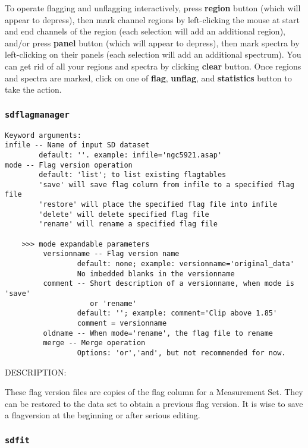 To operate flagging and unflagging interactively,
press {\bf region} button (which will appear to depress), 
then mark channel regions by left-clicking the mouse at start 
and end channels of the region (each selection will add an additional region), 
and/or press {\bf panel} button (which will appear to depress),
then mark spectra by left-clicking on their panels (each selection 
will add an additional spectrum).
You can get rid of all your regions and spectra by clicking {\bf clear} 
button.
Once regions and spectra are marked, click on one of {\bf flag},
{\bf unflag}, and {\bf statistics} button to take the action.


\subsubsection{{\tt sdflagmanager}}
\label{section:sd.sdtasks.tasks.sdflagmanager}

\begin{verbatim}
Keyword arguments:
infile -- Name of input SD dataset
        default: ''. example: infile='ngc5921.asap'
mode -- Flag version operation
        default: 'list'; to list existing flagtables
        'save' will save flag column from infile to a specified flag file
        'restore' will place the specified flag file into infile
        'delete' will delete specified flag file
        'rename' will rename a specified flag file

    >>> mode expandable parameters             
         versionname -- Flag version name
                 default: none; example: versionname='original_data'
                 No imbedded blanks in the versionname
         comment -- Short description of a versionname, when mode is 'save' 
                    or 'rename'
                 default: ''; example: comment='Clip above 1.85'
                 comment = versionname
         oldname -- When mode='rename', the flag file to rename
         merge -- Merge operation
                 Options: 'or','and', but not recommended for now.

\end{verbatim}

DESCRIPTION:

These flag version files are copies of the flag column for a
Measurement Set.  They can be restored to the data set to obtain
a previous flag version.  It is wise to
save a flagversion at the beginning or after serious editing.    


\subsubsection{{\tt sdfit}}
\label{section:sd.sdtasks.tasks.sdfit}

